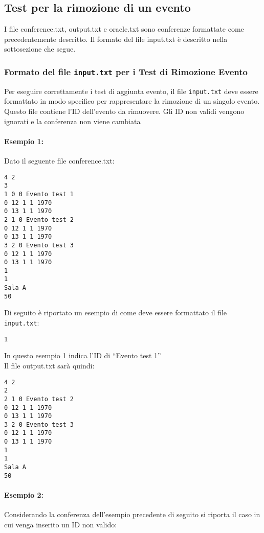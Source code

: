 \documentclass[11pt]{scrartcl} %
\begin{document}
\subsection{Test per la rimozione di un evento}
I file conference.txt, output.txt e oracle.txt sono conferenze formattate come precedentemente descritto. Il formato del file input.txt è descritto nella sottosezione che segue.

\subsubsection{Formato del file \texttt{input.txt} per i Test di Rimozione Evento}

Per eseguire correttamente i test di aggiunta evento, il file \texttt{input.txt} deve essere formattato in modo specifico per rappresentare la rimozione di un singolo evento. Questo file contiene l'ID dell'evento da rimuovere.
Gli ID non validi vengono ignorati e la conferenza non viene cambiata


\paragraph{Esempio 1:}
Dato il seguente file conference.txt:
\begin{lstlisting}
4 2
3
1 0 0 Evento test 1
0 12 1 1 1970
0 13 1 1 1970
2 1 0 Evento test 2
0 12 1 1 1970
0 13 1 1 1970
3 2 0 Evento test 3
0 12 1 1 1970
0 13 1 1 1970
1
1
Sala A
50
\end{lstlisting}

Di seguito è riportato un esempio di come deve essere formattato il file \texttt{input.txt}:

\begin{lstlisting}
1
\end{lstlisting}

In questo esempio 1 indica l'ID di ``Evento test 1''\\
Il file output.txt sarà quindi:

\begin{lstlisting}
4 2
2
2 1 0 Evento test 2
0 12 1 1 1970
0 13 1 1 1970
3 2 0 Evento test 3
0 12 1 1 1970
0 13 1 1 1970
1
1
Sala A
50
\end{lstlisting}


\paragraph{Esempio 2:}

Considerando la conferenza dell'esempio precedente di seguito si riporta il caso in cui venga inserito un ID non valido:
\end{document}
